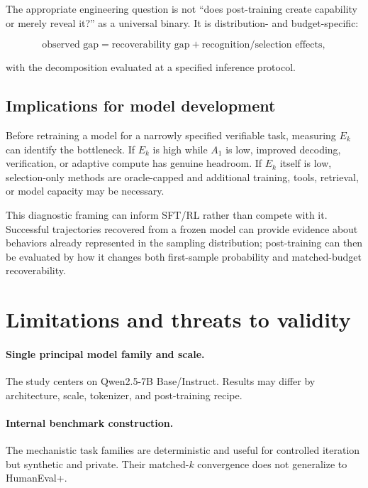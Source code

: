 \documentclass[11pt]{article}
\begin{document}
The appropriate engineering question is not ``does post-training create capability or merely reveal it?'' as a universal binary. It is distribution- and budget-specific:

\begin{equation}
\text{observed gap} = \text{recoverability gap} + \text{recognition/selection effects},
\end{equation}

with the decomposition evaluated at a specified inference protocol.

\subsection{Implications for model development}

Before retraining a model for a narrowly specified verifiable task, measuring $E_k$ can identify the bottleneck. If $E_k$ is high while $A_1$ is low, improved decoding, verification, or adaptive compute has genuine headroom. If $E_k$ itself is low, selection-only methods are oracle-capped and additional training, tools, retrieval, or model capacity may be necessary.

This diagnostic framing can inform SFT/RL rather than compete with it. Successful trajectories recovered from a frozen model can provide evidence about behaviors already represented in the sampling distribution; post-training can then be evaluated by how it changes both first-sample probability and matched-budget recoverability.

\section{Limitations and threats to validity}

\paragraph{Single principal model family and scale.}
The study centers on Qwen2.5-7B Base/Instruct. Results may differ by architecture, scale, tokenizer, and post-training recipe.

\paragraph{Internal benchmark construction.}
The mechanistic task families are deterministic and useful for controlled iteration but synthetic and private. Their matched-$k$ convergence does not generalize to HumanEval+.
\end{document}
